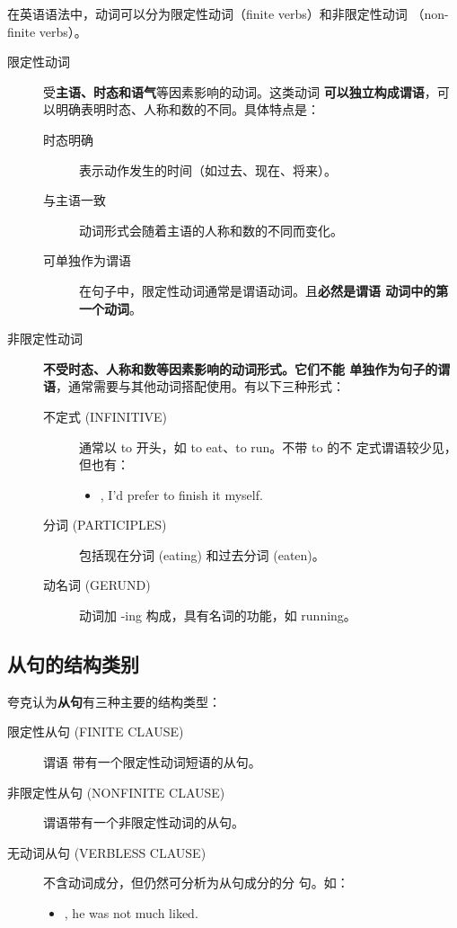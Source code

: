 在英语语法中，动词可以分为限定性动词（finite verbs）和非限定性动词
（non-finite verbs）。
\begin{description}
\item[限定性动词] 受\textbf{主语、时态和语气}等因素影响的动词。这类动词
  \textbf{可以独立构成谓语}，可以明确表明时态、人称和数的不同。具体特点是：
  \begin{description}
  \item[时态明确] 表示动作发生的时间（如过去、现在、将来）。
  \item[与主语一致] 动词形式会随着主语的人称和数的不同而变化。
  \item[可单独作为谓语] 在句子中，限定性动词通常是谓语动词。且\textbf{必然是谓语
      动词中的第一个动词}。
  \end{description}


\item[非限定性动词] \textbf{不受时态、人称和数等因素影响的动词形式。它们不能
    单独作为句子的谓语}，通常需要与其他动词搭配使用。有以下三种形式：
  \begin{description}
  \item[不定式 (INFINITIVE)] 通常以 to 开头，如 to eat、to run。不带 to 的不
    定式谓语较少见，但也有：
    \begin{itemize}
    \item {}, I'd prefer to finish it myself.
    \end{itemize}
  \item[分词 (PARTICIPLES)] 包括现在分词 (eating) 和过去分词 (eaten)。
  \item[动名词 (GERUND)] 动词加 -ing 构成，具有名词的功能，如 running。
  \end{description}
\end{description}

\subsection{从句的结构类别}

夸克认为\textbf{从句}有三种主要的结构类型：
\begin{description}
\item[限定性从句 (FINITE CLAUSE)]  谓语
  带有一个限定性动词短语的从句。
\item[非限定性从句 (NONFINITE CLAUSE)]  谓语带有一个非限定性动词的从句。
\item[无动词从句 (VERBLESS CLAUSE)] 不含动词成分，但仍然可分析为从句成分的分
  句。如：
  \begin{itemize}
  \item {}  , he was not much liked.
  \end{itemize}
\end{description}

